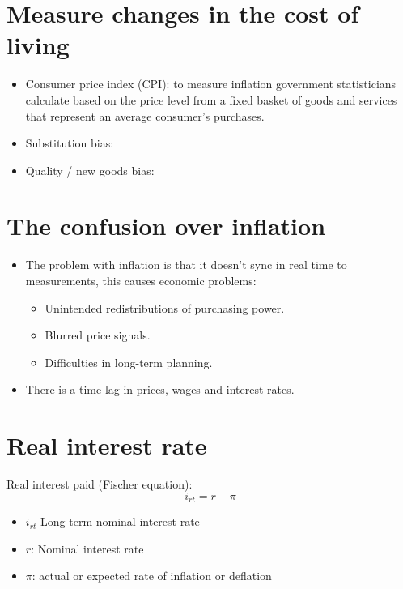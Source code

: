 \documentclass[openany]{book}
\begin{document}
\section{Measure changes in the cost of living}
\begin{itemize}
    \item Consumer price index (CPI): to measure inflation government statisticians calculate based on the price level from a fixed basket of goods and services that represent an average consumer's purchases. 
    \item Substitution bias: 
    \item Quality / new goods bias:  
\end{itemize}


\section{The confusion over inflation}
\begin{itemize}
    \item The problem with inflation is that it doesn't sync in real time to measurements, this causes economic problems:
    \begin{itemize}
            \item Unintended redistributions of purchasing power.
            \item Blurred price signals. 
            \item Difficulties in long-term planning.  
        \end{itemize}    
    \item There is a time lag in prices, wages and interest rates. 
\end{itemize}


\section{Real interest rate}
Real interest paid (Fischer equation): 
\[
  i_{rt} = r - \pi  
\]
\begin{itemize}
    \item $i_{rt}$ Long term nominal interest rate 
    \item $r$: Nominal interest rate 
    \item $\pi$: actual or expected rate of inflation or deflation
\end{itemize}












\end{document}
